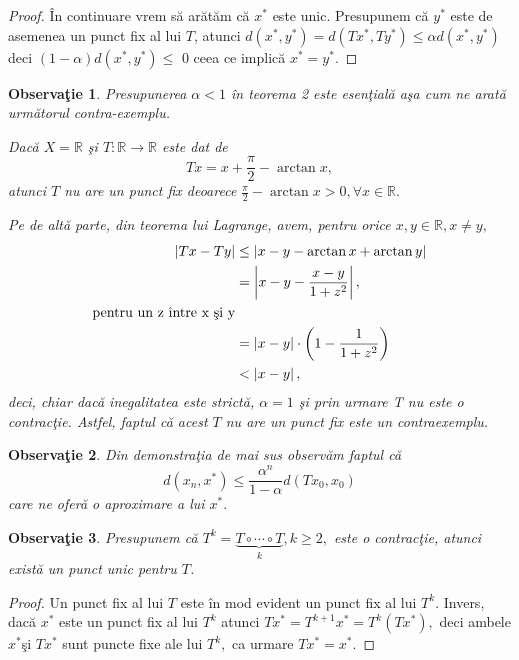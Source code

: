 \documentclass[a4paper,12pt,oneside]{report}
\newtheorem{remark}{Observa\c{t}ie}
\begin{document}
\begin{proof}
\^{I}n continuare vrem s\u{a} ar\u{a}t\u{a}m c\u{a} \(x^{\ast }\) este unic. Presupunem c\u{a} \(y^{\ast }\) este de asemenea un punct fix al lui \(T\), atunci \(d\left ( x^{\ast }, y^{\ast } \right ) = d\left ( Tx^{\ast }, Ty^{\ast } \right ) \leq \alpha d\left ( x^{\ast }, y^{\ast } \right )\) deci \(\left ( 1-\alpha  \right ) d\left ( x^{\ast }, y^{\ast } \right ) \leq\) 0 ceea ce implic\u{a} \(x^{\ast } = y^{\ast }. \)
\end{proof}
\begin{remark}
Presupunerea \(\alpha < 1\) \^{i}n teorema 2 este esen\c{t}ial\u{a} a\c{s}a cum ne arat\u{a} urm\u{a}torul contra-exemplu.

Dac\u{a} \(X = \mathbb{R}\) \c{s}i \(T : \mathbb{R}\rightarrow \mathbb{R}\) este dat de
\[Tx = x + \frac{\pi }{2} - \arctan x,
 \]
 atunci \(T\) nu are un punct fix deoarece \(\frac{\pi }{2} - \arctan x > 0, \forall x \in  \mathbb{R}.\)

 Pe de alt\u{a} parte, din teorema lui Lagrange, avem, pentru orice \(x,y \in \mathbb{R}, x\neq y, \)
\begin{equation} \nonumber
    \begin{split}
        \left | Tx - Ty \right |  & \leq \left | x - y - \arctan x + \arctan y \right | \\ &  = \left | x - y - \frac{x - y}{1 + z^{2}} \right |,
\\   \noindent \text{pentru un z \^{i}ntre x \c{s}i y}
       \\ & =\left | x - y  \right | \cdot \left ( 1 - \frac{1}{1 + z^{2}} \right ) \\ &  <  \left | x - y  \right |,
    \end{split}
\end{equation}
deci, chiar dac\u{a} inegalitatea este strict\u{a},  \( \alpha  = 1\) \c{s}i prin urmare T nu este o contrac\c{t}ie. Astfel, faptul c\u{a} acest \(T\) nu are un punct fix este un contraexemplu.
\end{remark}
\begin{remark}
Din demonstra\c{t}ia de mai sus observ\u{a}m faptul c\u{a}
\begin{displaymath}
  d\left ( x_{n}, x^{\ast } \right ) \leq  \frac{\alpha ^{n}}{1 - \alpha }d\left ( Tx_{0}, x_{0} \right )
\end{displaymath}
care ne ofer\u{a} o aproximare a lui \(x^{\ast }.\)
\end{remark}
\begin{remark}
Presupunem c\u{a} \(T^{k} = \underbrace {T\circ \cdots \circ T}_{k} , k\geq 2,\) este o contrac\c{t}ie, atunci exist\u{a} un punct unic pentru \(T\).
\end{remark}
\begin{proof}
Un punct fix al lui \(T\) este \^{i}n mod evident un punct fix al lui \(T^{k}.\) Invers, dac\u{a} \(x^{\ast }\) este un punct fix al lui \(T^{k}\) atunci \(Tx^{\ast } = T^{k+1}x^{\ast } = T^{k}\left ( Tx^{\ast } \right ),\) deci ambele \(x^{\ast } \)\c{s}i \(Tx^{\ast }\) sunt puncte fixe ale lui \(T^{k}, \) ca urmare \(Tx^{\ast } =x^{\ast }.\)
\end{proof}
\end{document}

